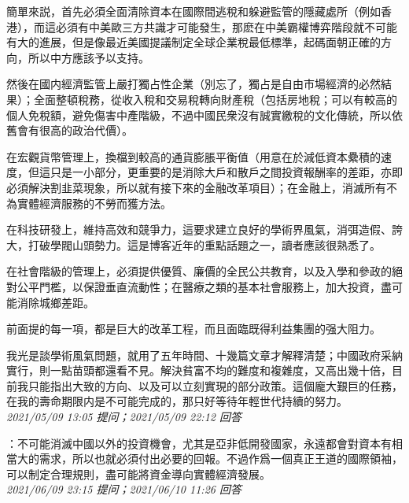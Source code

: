 \documentclass[twocolumn]{ctexart}
\begin{document}
簡單來説，首先必須全面清除資本在國際間逃稅和躲避監管的隱藏處所（例如香港），而這必須有中美歐三方共識才可能發生，那麽在中美霸權博弈階段就不可能有大的進展，但是像最近美國提議制定全球企業稅最低標準，起碼面朝正確的方向，所以中方應該予以支持。

然後在國内經濟監管上嚴打獨占性企業（別忘了，獨占是自由市場經濟的必然結果）；全面整頓稅務，從收入稅和交易稅轉向財產稅（包括房地稅；可以有較高的個人免稅額，避免傷害中產階級，不過中國民衆沒有誠實繳稅的文化傳統，所以依舊會有很高的政治代價）。

在宏觀貨幣管理上，換檔到較高的通貨膨脹平衡值（用意在於減低資本纍積的速度，但這只是一小部分，更重要的是消除大戶和散戶之間投資報酬率的差距，亦即必須解決割韭菜現象，所以就有接下來的金融改革項目）；在金融上，消滅所有不為實體經濟服務的不勞而獲方法。

在科技研發上，維持高效和競爭力，這要求建立良好的學術界風氣，消弭造假、誇大，打破學閥山頭勢力。這是博客近年的重點話題之一，讀者應該很熟悉了。

在社會階級的管理上，必須提供優質、廉價的全民公共教育，以及入學和參政的絕對公平門檻，以保證垂直流動性；在醫療之類的基本社會服務上，加大投資，盡可能消除城鄉差距。

前面提的每一項，都是巨大的改革工程，而且面臨既得利益集團的强大阻力。

我光是談學術風氣問題，就用了五年時間、十幾篇文章才解釋清楚；中國政府采納實行，則一點苗頭都還看不見。解決貧富不均的難度和複雜度，又高出幾十倍，目前我只能指出大致的方向、以及可以立刻實現的部分政策。這個龐大艱巨的任務，在我的壽命期限内是不可能完成的，那只好等待年輕世代持續的努力。
\\

\textit{\hfill\noindent\small 2021/05/09 13:05 提问；2021/05/09 22:12 回答}

：不可能消滅中國以外的投資機會，尤其是亞非低開發國家，永遠都會對資本有相當大的需求，所以也就必須付出必要的回報。不過作爲一個真正王道的國際領袖，可以制定合理規則，盡可能將資金導向實體經濟發展。
\\

\textit{\hfill\noindent\small 2021/06/09 23:15 提问；2021/06/10 11:26 回答}
\end{document}
